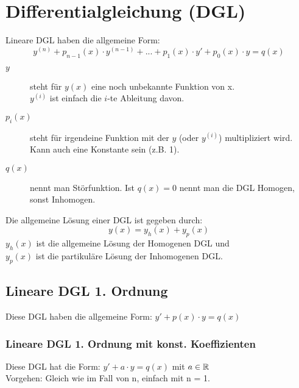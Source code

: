 \section{Differentialgleichung (DGL)}
Lineare DGL haben die allgemeine Form:
\[
	y^{(n)} + p_{n-1}(x) \cdot y^{(n-1)} + ... + p_1(x) \cdot y' + p_0(x) \cdot y = q(x) 
\]

\begin{description}
	\item [$y$] steht für $y(x)$ eine noch unbekannte Funktion von x.\\
			$y^{(i)}$ ist einfach die $i$-te Ableitung davon.

	\item [$p_i(x)$] steht für irgendeine Funktion mit der $y$ (oder $y^{(i)}$) multipliziert wird. Kann auch eine Konstante sein (z.B. 1).

	\item [$q(x)$] nennt man Störfunktion. Ist $q(x) = 0$ nennt man die DGL Homogen, sonst Inhomogen.
\end{description}

Die allgemeine Lösung einer DGL ist gegeben durch:
\[
	y(x) = y_h(x) + y_p(x)
\]
$y_h(x)$ ist die allgemeine Lösung der Homogenen DGL und\\
$y_p(x)$ ist die partikuläre Lösung der Inhomogenen DGL.

\subsection{Lineare DGL 1. Ordnung}
Diese DGL haben die allgemeine Form: $y' + p(x) \cdot y = q(x)$

\subsubsection{Lineare DGL 1. Ordnung mit konst. Koeffizienten}
Diese DGL hat die Form: $y' + a \cdot y = q(x)$ mit $a \in \mathbb{R}$\\

Vorgehen: Gleich wie im Fall von n, einfach mit n = 1.

